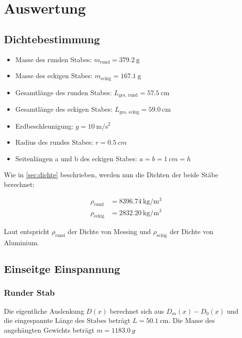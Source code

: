 \section{Auswertung}

\subsection{Dichtebestimmung}

\begin{itemize}
  \item Masse des runden Stabes: $m_{\text{rund}} = \SI{379,2}{\g}$
  \item Masse des eckigen Stabes: $m_{\text{eckig}} = \SI{167,1}{\g}$
  \item Gesamtlänge des runden Stabes: $L_{\text{ges, rund}} = \SI{57,5}{\cm}$
  \item Gesamtlänge des eckigen Stabes: $L_{\text{ges, eckig}} = \SI{59,0}{\cm}$
  \item Erdbeschleunigung: $g = \SI{10}{\meter \per \square \second}$
  \item Radius des rundes Stabes: $r= \SI {0,5}{cm}$
  \item Seitenlängen a und b des eckigen Stabes: $a=b=\SI{1}{cm}=h$
\end{itemize}

Wie in \ref{sec:dichte} beschrieben, werden nun die Dichten der beide Stäbe berechnet:

\begin{align*}
  \rho_{\text{rund}} &= \SI{8396,74}{\kilo \gram \per \cubic \meter}\\
  \rho_{\text{eckig}} &= \SI{2832,20}{\kilo \gram \per \cubic \meter}
\end{align*}

Laut \cite{dichte} entspricht $\rho_{\text{rund}}$ der Dichte von Messing und $\rho_{\text{eckig}}$ der
Dichte von Aluminium.

\newpage

\subsection{Einseitge Einspannung}

\subsubsection{Runder Stab}

Die eigentliche Auslenkung $D(x)$ berechnet sich aus $D_m(x) - D_0(x)$ und die eingespannte Länge des
Stabes beträgt $L = \SI{50,1}{\cm}$. Die Masse des angehängten Gewichts beträgt $m=\SI{1183,0}{g}$

